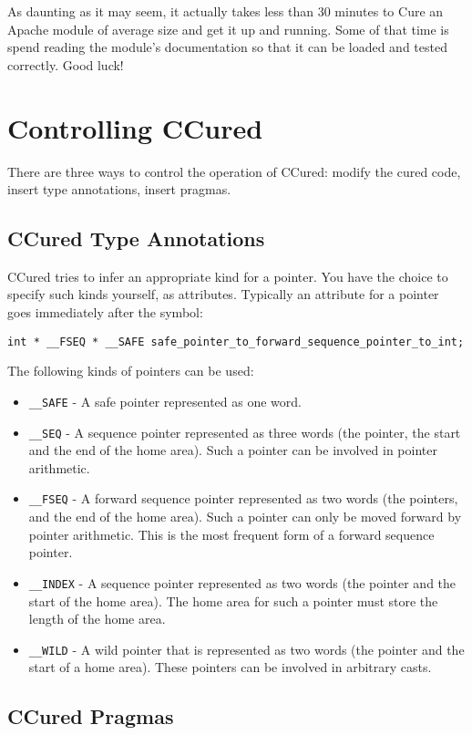 \documentclass{book}
\def\t#1{{\tt #1}}
\begin{document}
As daunting as it may seem, it actually takes less than 30 minutes to Cure
an Apache module of average size and get it up and running. Some of that
time is spend reading the module's documentation so that it can be loaded
and tested correctly. Good luck!

\chapter{Controlling CCured}

 There are three ways to control the operation of CCured: modify the cured
code, insert type annotations, insert pragmas. 
 
  \section{CCured Type Annotations}

 CCured tries to infer an appropriate kind for a pointer. You have the choice
to specify such kinds yourself, as attributes. Typically an attribute for a
pointer goes immediately after the \t{*} symbol:
\begin{verbatim}
int * __FSEQ * __SAFE safe_pointer_to_forward_sequence_pointer_to_int;
\end{verbatim}

 The following kinds of pointers can be used:
\begin{itemize}
\item \t{\_\_SAFE} - A safe pointer represented as one word.
\item \t{\_\_SEQ} - A sequence pointer represented as three words (the pointer,
the start and the end of the home area). Such a pointer can be involved in
pointer arithmetic.
\item \t{\_\_FSEQ} - A forward sequence pointer represented as two words (the
pointers, and the end of the home area). Such a pointer can only be moved
forward by pointer arithmetic. This is the most frequent form of a forward
sequence pointer. 
\item \t{\_\_INDEX} - A sequence pointer represented as two words (the pointer
and the start of the home area). The home area for such a pointer must store
the length of the home area.
\item \t{\_\_WILD} - A wild pointer that is represented as two words (the
pointer and the start of a home area). These pointers can be involved in
arbitrary casts. 
\end{itemize}

  \section{CCured Pragmas}\label{sec-pragma}
 
\end{document}
